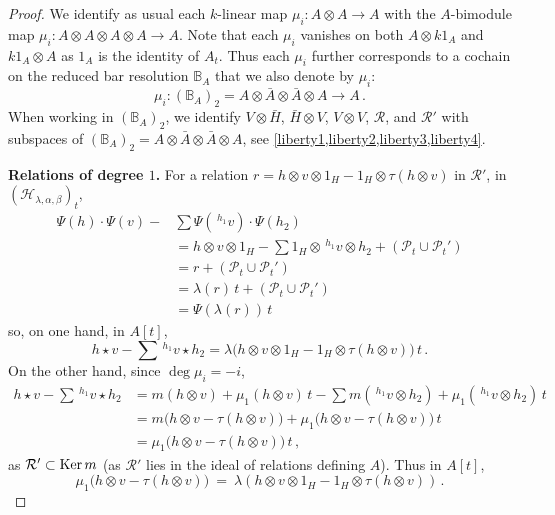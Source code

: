 \documentclass[11pt]{amsart}
\numberwithin{equation}{section}
\newcommand{\bA}{\bar{\A}}
\newcommand{\A}{A}%
\newcommand{\chabl}{\cH_{\lambda,\alpha,\beta}}
\newcommand{\sA}{A }
\newcommand{\R}{\mathcal{R}}
\renewcommand{\P}{\mathcal{P}}
\newcommand{\BB}{\mathbb{B}} %
\renewcommand{\_}[1]{\mbox{$_{\left( #1 \right)}$}}
\renewcommand{\ker}{\mbox{\rm Ker\,}}
\newcommand{\ot}{\otimes}
\newcommand{\cH}{\mathcal{H}}
\begin{document}
{\begin{proof}
We identify as usual each $k$-linear map
    $\mu_i: \A\ot \A\rightarrow \A$
    with the $\A$-bimodule map $\mu_i: \A\ot A\ot A\ot \A\rightarrow \A$.
    Note that 
    each $\mu_i$ vanishes on both $A\ot k1_A$ and $k1_A\ot A$
    as $1_{\A}$ is the identity of $\A_t$.
    Thus each $\mu_i$ further corresponds to 
    a cochain on the reduced bar resolution $\BB_{\A}$
that we also denote by $\mu_i$:
    $$
      \mu_i: (\BB_{\A})_2=\A \ot \bA\ot \bA\ot \A
      \longrightarrow \A \, .
          $$
          When working in $(\BB_{\A})_2$, we identify
        $V\ot \bar H$, $\bar H \ot V$, $V\ot V$, $\R$, and $\R'$
    with 
  subspaces of $(\BB_A)_2=A\ot \bar A \ot \bar A \ot A$, see
  \cref{liberty1,liberty2,liberty3,liberty4}.
    
    {\bf Relations of degree $1$.}
For a relation
$r=h\ot v\ot 1_H-1_H\ot \tau (h\ot v)$ in $\R'$,
in $(\chabl)_t$, 
\begin{equation*}%
\begin{aligned}
\Psi(h)\cdot \Psi(v) 
- & \sum \Psi(\, ^{ h_1}v)\cdot \Psi(h_2)
\\&=
h\ot v\ot 1_H -\sum 1_H\ot\, ^{h_1}v\ot h_2 
+(\P_t\cup\P_t')
\\&=
r+ ( \P_t \cup \P_t')
\\&=
\lambda(r)\, t + ( \P_t \cup \P_t') 
\\&=
\Psi(\lambda(r)) \, t
\end{aligned}
\end{equation*}
so, on one hand, in $A[t]$,
$$
h\star v 
-  \sum\, ^{ h_1}v \star h_2  
=
\lambda\big( h\ot v \ot 1_H 
-1_H\ot \tau(h\ot v)
\big)
\, t
\, .
$$
%
%
On the other hand, since $\deg \mu_i=-i$, 
  $$
  \begin{aligned}
   h\star v 
   -  \sum\, ^{ h_1}v \star h_2
 &=
  m(h\ot v) + \mu_1( h\ot v )\, t 
 -
\sum 
   m(\, ^ {h_1} v\ot h_2) + \mu_1(\, ^{h_1}v\ot h_2)\, t  
   \\ &=
   m\big(h\ot v - \tau(h\ot v)\big) 
   + \mu_1\big( h\ot v  -\tau(h\ot v)\big)\, t
     \\ &=
  \mu_1\big( h\ot v  -\tau(h\ot v)\big)\, t
   \, ,
 \end{aligned}
 $$
 as $\R'\subset \ker m$
 (as $\R'$ lies in the ideal of relations defining $A$).
 Thus in $A[t]$,
 \begin{equation}\label{FirstMultMapToLambda}
   \mu_1\big(h\ot v - \tau(h\ot v)\big)
   \ =\ 
   \lambda (h\ot v \ot 1_H - 1_H\ot
   \tau(h\ot v))
   \, .
   \end{equation}


\end{proof}}
\end{document}
